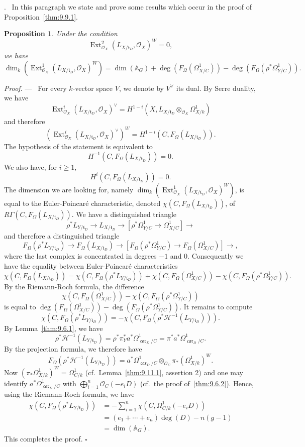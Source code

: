 \documentclass[12pt,a4paper,oneside,english,leqno]{smfart}
\makeatletter
\numberwithin{equation}{subsection}
\newcounter{theo}
\numberwithin{theo}{subsection}
\newenvironment{paragr}[1][]{\medskip\refstepcounter{subsection}%
  \par\noindent\hspace*{\parindent}\thesubsection.\ \emph{#1}%
  \@ifundefined{@empty}{}{}\ignorespaces}{\medskip}
\theoremstyle{plain}
\newtheorem{proposition}[theo]{Proposition}
\theoremstyle{definition}
\theoremstyle{remark}
\newenvironment{preuve}[1][]{\medskip\noindent\textit{Proof.} #1 ---\ }%
  {\hfill\ensuremath{\square}\medskip}
\DeclareMathOperator{\Ext}{Ext}
\DeclareMathOperator{\car}{\mathfrak{car}}
\newcommand{\AAA}{\mathbb{A}}
\newcommand{\oc}{\mathcal{O}}
\newcommand{\hc}{\mathcal{H}}
\newcommand{\tgo}{\mathfrak{t}}
\renewcommand{\geq}{\geqslant}
\makeatother
\begin{document}
\begin{paragr}\label{S:9.10}
In this paragraph we state and prove some results which occur in the proof of Proposition~\ref{thm:9.9.1}.

\begin{proposition}\label{thm:9.10.1}
Under the condition
$$\Ext^2_{\oc_X}(L_{X/\tgo_D},\oc_X)^W=0,$$
we have
$$\dim_k(\Ext^1_{\oc_X}(L_{X/\tgo_D},\oc_X)^W)=\dim(\AAA_G)+\deg(F_\Omega(\Omega^1_{X/C}))-\deg(F_\Omega(\rho^*\Omega^1_{Y/C})).$$
\end{proposition}

\begin{preuve}
For every $k$-vector space $V$, we denote by $V^\vee$ its dual. By Serre duality, we have
$$\Ext^i_{\oc_X}(L_{X/\tgo_D},\oc_X)^\vee=H^{1-i}(X,L_{X/\tgo_D}\otimes_{\oc_X}\Omega^1_{X/k})$$
and therefore
$$(\Ext^i_{\oc_X}(L_{X/\tgo_D},\oc_X)^\vee)^W=H^{1-i}(C,F_\Omega(L_{X/\tgo_D})).$$
The hypothesis of the statement is equivalent to
$$H^{-1}(C,F_\Omega(L_{X/\tgo_D}))=0.$$
We also have, for $i\geq 1$,
$$H^i(C,F_\Omega(L_{X/\tgo_D}))=0.$$
The dimension we are looking for, namely $\dim_k(\Ext^1_{\oc_X}(L_{X/\tgo_D},\oc_X)^W)$, is equal to the Euler-Poincar\'e characteristic, denoted $\chi(C,F_\Omega(L_{X/\tgo_D}))$, of $R\Gamma(C,F_\Omega(L_{X/\tgo_D}))$. We have a distinguished triangle
$$\rho^*L_{Y/\tgo_D}\to L_{X/\tgo_D}\to[\rho^*\Omega^1_{Y/C}\to\Omega^1_{X/C}]\to$$
and therefore a distinguished triangle
$$F_\Omega(\rho^*L_{Y/\tgo_D})\to F_\Omega(L_{X/\tgo_D})\to[F_\Omega(\rho^*\Omega^1_{Y/C})\to F_\Omega(\Omega^1_{X/C})]\to,$$
where the last complex is concentrated in degrees $-1$ and $0$. Consequently we have the equality between Euler-Poincar\'e characteristics
$$\chi(C,F_\Omega(L_{X/\tgo_D}))=\chi(C,F_\Omega(\rho^*L_{Y/\tgo_D}))+\chi(C,F_\Omega(\Omega^1_{X/C}))-\chi(C,F_\Omega(\rho^*\Omega^1_{Y/C})).$$
By the Riemann-Roch formula, the difference
$$\chi(C,F_\Omega(\Omega^1_{X/C}))-\chi(C,F_\Omega(\rho^*\Omega^1_{Y/C}))$$
is equal to $\deg(F_\Omega(\Omega^1_{X/C}))-\deg(F_\Omega(\rho^*\Omega^1_{Y/C}))$. It remains to compute
$$\chi(C,F_\Omega(\rho^*L_{Y/\tgo_D}))=-\chi(C,F_\Omega(\rho^*\hc^{-1}(L_{Y/\tgo_D}))).$$
By Lemma~\ref{thm:9.6.1}, we have
$$\rho^*\hc^{-1}(L_{Y/\tgo_D})=\rho^*\pi_Y^*a^*\Omega^1_{\car_D/C}=\pi^*a^*\Omega^1_{\car_D/C}.$$
By the projection formula, we therefore have
$$F_\Omega(\rho^*\hc^{-1}(L_{Y/\tgo_D}))=a^*\Omega^1_{\car_D/C}\otimes_{\oc_C}\pi_*(\Omega^1_{X/k})^W.$$
Now $(\pi_*\Omega^1_{X/k})^W=\Omega^1_{C/k}$ (cf.\ Lemma~\ref{thm:9.11.1}, assertion 2) and one may identify $a^*\Omega^1_{\car_D/C}$ with $\bigoplus_{i=1}^n\oc_C(-e_iD)$ (cf.\ the proof of~\ref{thm:9.6.2}). Hence, using the Riemann-Roch formula, we have
\begin{align*}
\chi(C,F_\Omega(\rho^*L_{Y/\tgo_D}))&=-\sum_{i=1}^n\chi(C,\Omega^1_{C/k}(-e_iD))\\
&=(e_1+\cdots+e_n)\deg(D)-n(g-1)\\
&=\dim(\AAA_G).
\end{align*}
This completes the proof.
\end{preuve}


\end{paragr}
\end{document}
